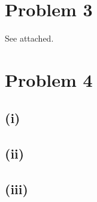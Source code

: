 \documentclass{article}
\begin{document}
\section*{Problem 3}
See attached.

\section*{Problem 4}

\subsection*{(i)}

\subsection*{(ii)}

\subsection*{(iii)}
\end{document}
